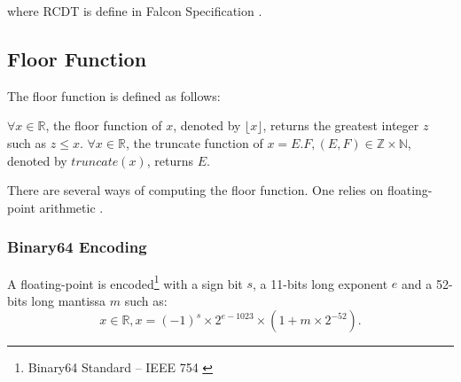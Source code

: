 \documentclass[runningheads]{llncs}
\begin{document}
\noindent where RCDT is define in Falcon Specification \cite{prest2020falcon}.

\subsection{Floor Function}\label{subsec:floorfunction}
The floor function is defined as follows:
\begin{definition}\label{def:floorfunction}
  $\forall x \in \mathbb{R}$, the floor function of $x$, denoted by $\lfloor x \rfloor$, 
  returns the greatest integer $z$ such as $z\leq x$.\newline
  $\forall x \in \mathbb{R}$, the truncate function of $x=E.F,(E,F)\in\mathbb{Z}\times\mathbb{N}$, denoted by $truncate(x)$, returns $E$.
\end{definition}
There are several ways of computing the floor function. One
relies on floating-point arithmetic \cite{kahan1996ieee}.
\subsubsection{Binary64 Encoding}
A floating-point is encoded\footnote{Binary64 Standard -- IEEE 754 \cite{kahan1996ieee}} with a sign bit $s$, a 11-bits long exponent $e$ and a 52-bits long mantissa $m$ such as:
\begin{equation}\label{eq:ieee754}
  x\in \mathbb{R}, x = (-1)^s \times 2^{e-1023} \times (1+ m\times2^{-52}).
\end{equation}
\end{document}
